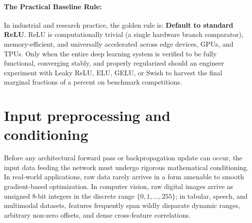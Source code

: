 \paragraph{The Practical Baseline Rule:}
In industrial and research practice, the golden rule is: \textbf{Default to standard ReLU}. ReLU is computationally trivial (a single hardware branch comparator), memory-efficient, and universally accelerated across edge devices, GPUs, and TPUs. Only when the entire deep learning system is verified to be fully functional, converging stably, and properly regularized should an engineer experiment with Leaky ReLU, ELU, GELU, or Swish to harvest the final marginal fractions of a percent on benchmark competitions.

\section{Input preprocessing and conditioning}
\label{sec:data_preprocessing_conditioning}

Before any architectural forward pass or backpropagation update can occur, the input data feeding the network must undergo rigorous mathematical conditioning. In real-world applications, raw data rarely arrives in a form amenable to smooth gradient-based optimization. In computer vision, raw digital images arrive as unsigned 8-bit integers in the discrete range $\{0, 1, \dots, 255\}$; in tabular, speech, and multimodal datasets, features frequently span wildly disparate dynamic ranges, arbitrary non-zero offsets, and dense cross-feature correlations.

